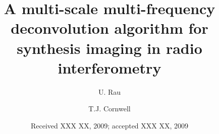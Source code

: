 \documentclass[structabstract]{stylefiles/aa}
\begin{document}
%
   \title{A multi-scale multi-frequency deconvolution algorithm
for synthesis imaging in radio interferometry}


   \author{U. Rau
          \and
          T.J. Cornwell  %
          }


   \date{Received XXX XX, 2009; accepted XXX XX, 2009}

 
\end{document}
